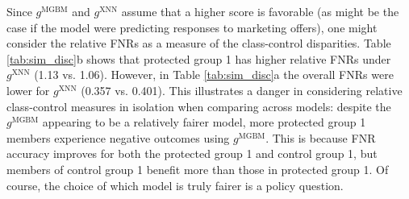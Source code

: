 \documentclass[information,article,accept,moreauthors,pdftex]{Definitions/mdpi}
\begin{document}
Since $g^{\text{MGBM}}$ and $g^{\text{XNN}}$ assume that a higher score is favorable (as might be the case if the model were predicting responses to marketing offers), one might consider the relative FNRs as a measure of the class-control disparities. Table \ref{tab:sim_disc}{b} shows that protected group 1 has higher relative FNRs under $g^{\text{XNN}}$ (1.13 vs. 1.06).  However, in Table \ref{tab:sim_disc}{a}  the overall FNRs were lower for  $g^{\text{XNN}}$ (0.357 vs. 0.401). This illustrates a danger in considering relative class-control measures in isolation when comparing across models: despite the $g^\text{MGBM}$ appearing to be a relatively fairer model, more protected group 1 members experience negative outcomes using $g^{\text{MGBM}}$. This is because FNR accuracy improves for both the protected group 1 and control group 1, but members of control group 1 benefit more than those in protected group 1.  Of course, the choice of which model is truly fairer is a policy question.
\end{document}
